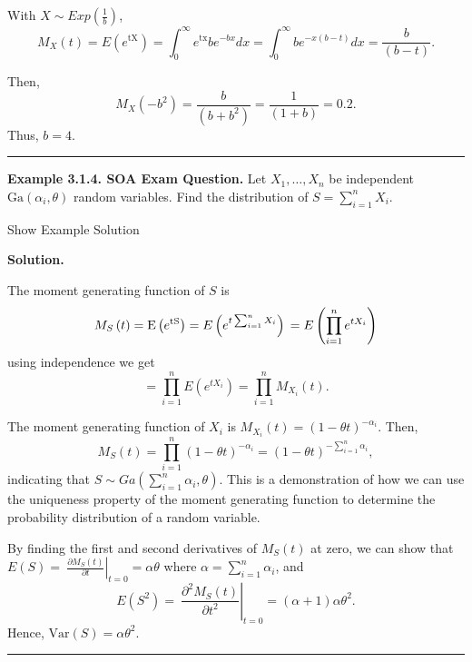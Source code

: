 \documentclass[]{book}
\theoremstyle{definition}
\theoremstyle{definition}
\theoremstyle{definition}
\theoremstyle{remark}
\begin{document}
With \(X \sim Exp \left( \frac{1}{b}\right)\),
\[M_{X}\left( t \right) = E\left( e^{\text{tX}} \right) = \int_{0}^{\infty}{e^{\text{tx}}be^{- bx} dx} = \int_{0}^{\infty}{be^{- x\left( b - t \right)} dx} = \frac{b}{\left( b - t \right)}.\]

Then,
\[M_{X}\left( - b^{2} \right) = \frac{b}{\left( b + b^{2} \right)} = \frac{1}{\left( 1 + b \right)} = 0.2.\]
Thus, \(b = 4\).

\begin{center}\rule{0.5\linewidth}{\linethickness}\end{center}

\textbf{Example 3.1.4. SOA Exam Question.} Let \(X_{1}, \ldots, X_{n}\)
be independent \(\text{Ga}\left( \alpha_{i},\theta \right)\) random
variables. Find the distribution of \(S = \sum_{i = 1}^{n}X_{i}\).

Show Example Solution

\hypertarget{toggleExampleLoss.1.4}{}
\textbf{Solution.}

The moment generating function of \(S\) is
\[M_{S}\left( t \right) = \text{E}\left( e^{\text{tS}} \right) = E\left( e^{t\sum_{i = 1}^{n}X_{i}} \right) \\
= E\left( \prod_{i = 1}^{n}e^{tX_{i}} \right)\] using independence we
get\\
\[= \prod_{i = 1}^{n}{E\left( e^{tX_{i}} \right) = \prod_{i = 1}^{n}{M_{X_{i}}\left( t \right)}} .\]

The moment generating function of \(X_{i}\) is
\(M_{X_{i}}\left( t \right) = \left( 1 - \theta t \right)^{- \alpha_{i}}\).
Then,
\[M_{S}\left( t \right) = \prod_{i = 1}^{n}\left( 1 - \theta t \right)^{- \alpha_{i}} = \left( 1 - \theta t \right)^{- \sum_{i = 1}^{n}\alpha_{i}}, \]
indicating that
\(S\sim Ga\left( \sum_{i = 1}^{n}\alpha_{i},\theta \right)\). This is a
demonstration of how we can use the uniqueness property of the moment
generating function to determine the probability distribution of a
random variable.

By finding the first and second derivatives of \(M_{S}\left( t \right)\)
at zero, we can show that
\(E\left( S \right) = \left. \ \frac{\partial M_{S}\left( t \right)}{\partial t} \right|_{t = 0} = \alpha\theta\)
where \(\alpha = \sum_{i = 1}^{n}\alpha_{i}\), and
\[E\left( S^{2} \right) = \left. \ \frac{\partial^{2}M_{S}\left( t \right)}{\partial t^{2}} \right|_{t = 0} = \left( \alpha + 1 \right)\alpha\theta^{2}.\]
Hence, \(\mathrm{Var}\left( S \right) = \alpha\theta^{2}\).

\begin{center}\rule{0.5\linewidth}{\linethickness}\end{center}
\end{document}
